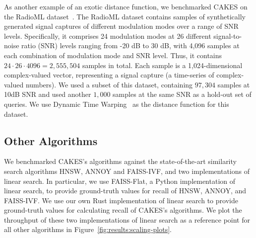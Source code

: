 As another example of an exotic distance function, we benchmarked CAKES on the RadioML dataset~\cite{oshea2018radioml}.
The RadioML dataset contains samples of synthetically generated signal captures of different modulation modes over a range of SNR levels.
Specifically, it comprises 24 modulation modes at 26 different signal-to-noise ratio (SNR) levels ranging from -20 dB to 30 dB, with 4,096 samples at each combination of modulation mode and SNR level.
Thus, it contains $24 \cdot 26 \cdot 4096 = 2,555,504$ samples in total.
Each sample is a 1,024-dimensional complex-valued vector, representing a signal capture (a time-series of complex-valued numbers).
We used a subset of this dataset, containing $97,304$ samples at 10dB SNR and used another $1,000$ samples at the same SNR as a hold-out set of queries.
We use Dynamic Time Warping~\cite{muller2007dynamic} as the distance function for this dataset.


\subsection{Other Algorithms}
\label{sec:datasets-and-benchmarks:other-algorithms}

We benchmarked CAKES's algorithms against the state-of-the-art similarity search algorithms HNSW, ANNOY and FAISS-IVF, and two implementations of linear search.
In particular, we use FAISS-Flat, a Python implementation of linear search, to provide ground-truth values for recall of HNSW, ANNOY, and FAISS-IVF.
We use our own Rust implementation of linear search to provide ground-truth values for calculating recall of CAKES's algorithms.
We plot the throughput of these two implementations of linear search as a reference point for all other algorithms in Figure~\ref{fig:results:scaling-plots}.
